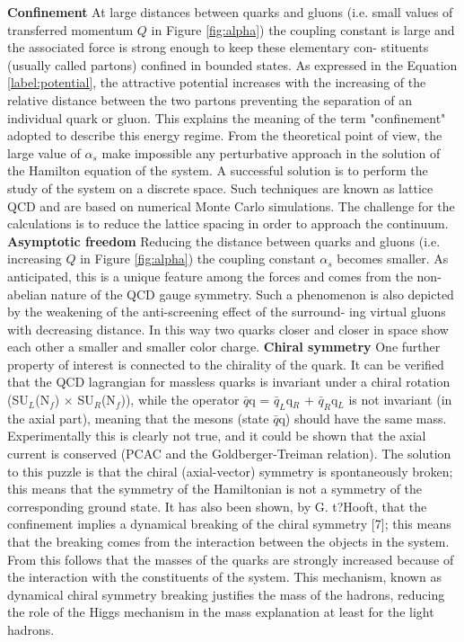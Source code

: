 \textbf{Confinement}
At large distances between quarks and gluons (i.e. small values of transferred momentum $Q$ in Figure \ref{fig:alpha}) the coupling constant is large and the associated force is strong enough to keep these elementary con- stituents (usually called partons) confined in bounded states. As expressed in the Equation \ref{label:potential}, the attractive potential increases with the increasing of the relative distance between the two partons preventing the separation of an individual quark or gluon. This explains the meaning of the term "confinement" adopted to describe this energy regime. From the theoretical point of view, the large value of $\alpha_{s}$ make impossible any perturbative approach in the solution of the Hamilton equation of the system. A successful solution is to perform the study of the system on a discrete space. Such techniques are known as lattice QCD and are based on numerical Monte Carlo simulations. The challenge for the calculations is to reduce the lattice spacing in order to approach the continuum.\\

\textbf{Asymptotic freedom}
Reducing the distance between quarks and gluons (i.e. increasing $Q$ in Figure \ref{fig:alpha}) the coupling constant $\alpha_{s}$ becomes smaller. As anticipated, this is a unique feature among the forces and comes from the non-abelian nature of the QCD gauge symmetry. Such a phenomenon is also depicted by the weakening of the anti-screening effect of the surround- ing virtual gluons with decreasing distance. In this way two quarks closer and closer in space show each other a smaller and smaller color charge.
\textbf{Chiral symmetry}
One further property of interest is connected to the chirality of the quark. It can be verified that the QCD lagrangian for massless quarks is invariant under a chiral rotation (SU$_{L}$(N$_{f}$) $\times$ SU$_{R}$(N$_{f}$)), while the operator $\bar{q}$q = $\bar{q}_{L}$q$_{R}$ + $\bar{q}_{R}$q$_{L}$ is not invariant (in the axial part), meaning that the mesons (state $\bar{q}$q) should have the same mass. Experimentally this is clearly not true, and it could be shown that the axial current is conserved (PCAC and the Goldberger-Treiman relation). The solution to this puzzle is that the chiral (axial-vector) symmetry is spontaneously broken; this means that the symmetry of the Hamiltonian is not a symmetry of the corresponding ground state. It has also been shown, by G. t?Hooft, that the confinement implies a dynamical breaking of the chiral symmetry [7]; this means that the breaking comes from the interaction between the objects in the system. From this follows that the masses of the quarks are strongly increased because of the interaction with the constituents of the system. This mechanism, known as dynamical chiral symmetry breaking justifies the mass of the hadrons, reducing the role of the Higgs mechanism in the mass explanation at least for the light hadrons.


